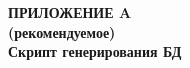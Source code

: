 \begin{center}
\textbf{
\MakeUppercase{Приложение A}\\
(рекомендуемое)\\
Скрипт генерирования БД}
\end{center}


